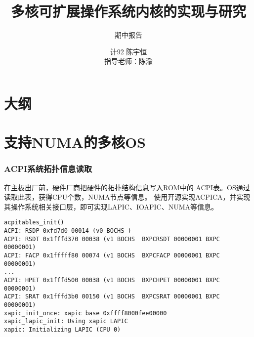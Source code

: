 \documentclass{beamer}
\title
{多核可扩展操作系统内核的实现与研究}
\subtitle{期中报告}
\author{计92 陈宇恒\\指导老师：陈渝}
\institute{清华大学计算机系}
\begin{document}
  \frame
  {
    \titlepage
  }

\section*{大纲}
\frame{\tableofcontents }




\section{支持NUMA的多核OS}
\begin{frame}[fragile]
	\frametitle{ACPI系统拓扑信息读取}
	在主板出厂前，硬件厂商把硬件的拓扑结构信息写入ROM中的
	ACPI表。OS通过读取此表，获得CPU个数，NUMA节点等信息。
	使用开源实现ACPICA，并实现其操作系统相关接口层，即可实现LAPIC、IOAPIC、NUMA等信息。
	\scriptsize{
	\begin{verbatim}
acpitables_init()
ACPI: RSDP 0xfd7d0 00014 (v0 BOCHS )
ACPI: RSDT 0x1fffd370 00038 (v1 BOCHS  BXPCRSDT 00000001 BXPC 00000001)
ACPI: FACP 0x1fffff80 00074 (v1 BOCHS  BXPCFACP 00000001 BXPC 00000001)
...
ACPI: HPET 0x1fffd500 00038 (v1 BOCHS  BXPCHPET 00000001 BXPC 00000001)
ACPI: SRAT 0x1fffd3b0 00150 (v1 BOCHS  BXPCSRAT 00000001 BXPC 00000001)
xapic_init_once: xapic base 0xffff8000fee00000
xapic_lapic_init: Using xapic LAPIC
xapic: Initializing LAPIC (CPU 0)
	\end{verbatim}
}

\end{frame}
\end{document}
